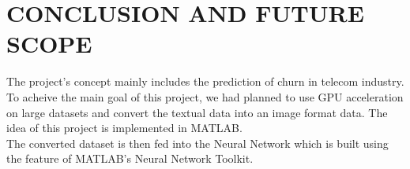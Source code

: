 

\chapter{CONCLUSION AND FUTURE SCOPE}

\hspace{0.9cm} The project's concept mainly includes the prediction of churn in telecom industry. To acheive the main goal of this project, we had planned to use GPU acceleration on large datasets and convert the textual data into an image format data. The idea of this project is implemented in MATLAB.\\ The converted dataset is then fed into the Neural Network which is built using the feature of MATLAB's Neural Network Toolkit.

